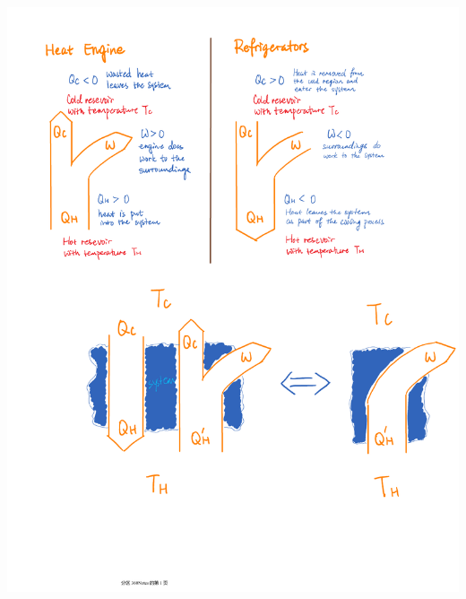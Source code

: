 \documentclass[10pt]{article}
\theoremstyle{break}
\theoremstyle{break}
\begin{document}
\begin{center}
\includegraphics[scale=0.5]{cycles.pdf}
\end{center}
\end{document}
